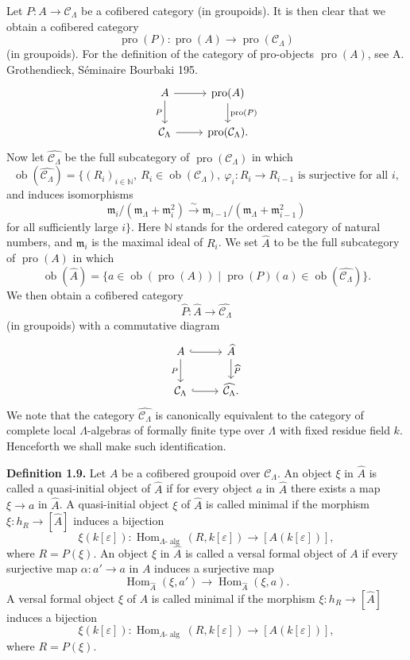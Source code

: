 \documentclass[11pt]{article}
\providecommand{\Hom}{\operatorname{Hom}}
\providecommand{\ob}{\operatorname{ob}}
\providecommand{\pro}{\operatorname{pro}}
\providecommand{\ma}{\mathfrak m_\Lambda}
\providecommand{\CL}{\mathcal C_\Lambda}
\providecommand{\alg}{\operatorname{alg}}
\begin{document}
Let $P:A\to\CL$ be a cofibered category (in groupoids). It is then clear that we obtain a cofibered category
\[
 \pro(P):\pro(A)\longrightarrow\pro(\CL)
\]
(in groupoids). For the definition of the category of pro-objects $\pro(A)$, see A. Grothendieck, S\'eminaire Bourbaki 195.
\[
\begin{tikzcd}
 A \arrow[r] \arrow[d,"P"'] & \pro(A) \arrow[d,"\pro(P)"]\\
 \CL \arrow[r] & \pro(\CL).
\end{tikzcd}
\]
Now let $\widehat{\CL}$ be the full subcategory of $\pro(\CL)$ in which
\[
 \ob(\widehat{\CL})=\{(R_i)_{i\in\mathbb N},\ R_i\in\ob(\CL),\ \varphi_i:R_i\to R_{i-1}\text{ is surjective for all }i,
\]
and induces isomorphisms
\[
 \mathfrak m_i/(\ma+\mathfrak m_i^2)\xrightarrow{\sim}
 \mathfrak m_{i-1}/(\ma+\mathfrak m_{i-1}^2)
\]
for all sufficiently large $i\}$. Here $\mathbb N$ stands for the ordered category of natural numbers, and $\mathfrak m_i$ is the maximal ideal of $R_i$. We set $\widehat A$ to be the full subcategory of $\pro(A)$ in which
\[
 \ob(\widehat A)=\{a\in\ob(\pro(A))\mid \pro(P)(a)\in\ob(\widehat{\CL})\}.
\]
We then obtain a cofibered category
\[
 \widehat P:\widehat A\longrightarrow\widehat{\CL}
\]
(in groupoids) with a commutative diagram
\[
\begin{tikzcd}
 A \arrow[r,hook] \arrow[d,"P"'] & \widehat A \arrow[d,"\widehat P"]\\
 \CL \arrow[r,hook] & \widehat{\CL}.
\end{tikzcd}
\]
We note that the category $\widehat{\CL}$ is canonically equivalent to the category of complete local $\Lambda$-algebras of formally finite type over $\Lambda$ with fixed residue field $k$. Henceforth we shall make such identification.

\textbf{Definition 1.9.} Let $A$ be a cofibered groupoid over $\CL$. An object $\xi$ in $\widehat A$ is called a quasi-initial object of $\widehat A$ if for every object $a$ in $\widehat A$ there exists a map $\xi\to a$ in $\widehat A$. A quasi-initial object $\xi$ of $\widehat A$ is called minimal if the morphism $\xi:h_R\to[\widehat A]$ induces a bijection
\[
 \xi(k[\varepsilon]):\Hom_{\Lambda\text{-}\alg}(R,k[\varepsilon])\longrightarrow [A(k[\varepsilon])],
\]
where $R=P(\xi)$. An object $\xi$ in $\widehat A$ is called a versal formal object of $A$ if every surjective map $\alpha:a'\to a$ in $A$ induces a surjective map
\[
 \Hom_{\widehat A}(\xi,a')\longrightarrow\Hom_{\widehat A}(\xi,a).
\]
A versal formal object $\xi$ of $A$ is called minimal if the morphism $\xi:h_R\to[\widehat A]$ induces a bijection
\[
 \xi(k[\varepsilon]):\Hom_{\Lambda\text{-}\alg}(R,k[\varepsilon])\longrightarrow [A(k[\varepsilon])],
\]
where $R=P(\xi)$.
\end{document}
